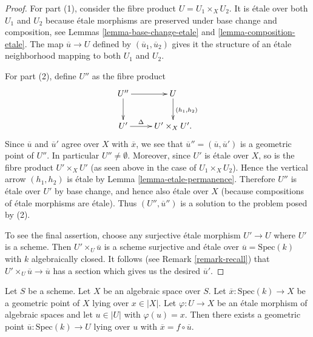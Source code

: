 \begin{proof}
For part (1), consider the fibre product $U = U_1 \times_X U_2$.
It is \'etale over both $U_1$ and $U_2$ because \'etale morphisms are
preserved under base change and composition, see
Lemmas \ref{lemma-base-change-etale} and \ref{lemma-composition-etale}.
The map $\overline{u} \to U$ defined by $(\overline{u}_1, \overline{u}_2)$
gives it the structure of an \'etale neighborhood mapping to both
$U_1$ and $U_2$.

\medskip\noindent
For part (2), define $U''$ as the fibre product
$$
\xymatrix{
U'' \ar[r] \ar[d] & U \ar^{(h_1,h_2)}[d] \\
U' \ar^-\Delta[r] & U' \times_X U'.
}
$$
Since $\overline{u}$ and $\overline{u}'$ agree over $X$ with $\overline{x}$,
we see that $\overline{u}'' = (\overline{u}, \overline{u}')$ is a geometric
point of $U''$. In particular $U'' \not = \emptyset$.
Moreover, since $U'$ is \'etale over $X$, so is the fibre product
$U'\times_X U'$ (as seen above in the case of $U_1 \times_X U_2$).
Hence the vertical arrow $(h_1, h_2)$ is \'etale by
Lemma \ref{lemma-etale-permanence}.
Therefore $U''$ is \'etale over $U'$ by base change, and hence also
\'etale over $X$ (because compositions of \'etale morphisms are \'etale).
Thus $(U'', \overline{u}'')$ is a solution to the problem posed by (2).

\medskip\noindent
To see the final assertion, choose any surjective \'etale morphism
$U' \to U$ where $U'$ is a scheme. Then
$U' \times_U \overline{u}$ is a scheme surjective and \'etale over
$\overline{u} = \text{Spec}(k)$ with $k$ algebraically closed.
It follows (see
Remark \ref{remark-recall})
that $U' \times_U \overline{u} \to \overline{u}$ has a section
which gives us the desired $\overline{u}'$.
\end{proof}

\begin{lemma}
\label{lemma-geometric-lift-to-usual}
Let $S$ be a scheme. Let $X$ be an algebraic space over $S$.
Let $\overline{x} : \text{Spec}(k) \to X$ be a geometric point of $X$
lying over $x \in |X|$. Let $\varphi : U \to X$ be an \'etale morphism
of algebraic spaces and let $u \in |U|$ with $\varphi(u) = x$.
Then there exists a geometric point
$\overline{u} : \text{Spec}(k) \to U$ lying over $u$ with
$\overline{x} = f \circ \overline{u}$.
\end{lemma}

